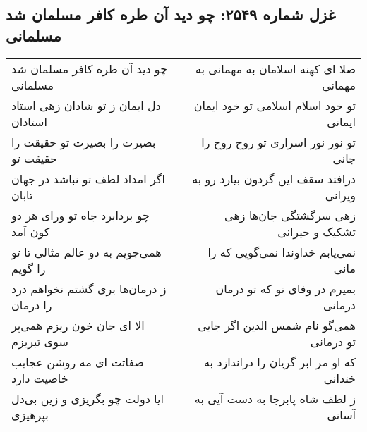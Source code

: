 \begin{center}
\section*{غزل شماره ۲۵۴۹: چو دید آن طره کافر مسلمان شد مسلمانی}
\label{sec:2549}
\begin{longtable}{l p{0.5cm} r}
چو دید آن طره کافر مسلمان شد مسلمانی
&&
صلا ای کهنه اسلامان به مهمانی به مهمانی
\\
دل ایمان ز تو شادان زهی استاد استادان
&&
تو خود اسلام اسلامی تو خود ایمان ایمانی
\\
بصیرت را بصیرت تو حقیقت را حقیقت تو
&&
تو نور نور اسراری تو روح روح را جانی
\\
اگر امداد لطف تو نباشد در جهان تابان
&&
درافتد سقف این گردون بیارد رو به ویرانی
\\
چو بردابرد جاه تو ورای هر دو کون آمد
&&
زهی سرگشتگی جان‌ها زهی تشکیک و حیرانی
\\
همی‌جویم به دو عالم مثالی تا تو را گویم
&&
نمی‌یابم خداوندا نمی‌گویی که را مانی
\\
ز درمان‌ها بری گشتم نخواهم درد را درمان
&&
بمیرم در وفای تو که تو درمان درمانی
\\
الا ای جان خون ریزم همی‌پر سوی تبریزم
&&
همی‌گو نام شمس الدین اگر جایی تو درمانی
\\
صفاتت ای مه روشن عجایب خاصیت دارد
&&
که او مر ابر گریان را دراندازد به خندانی
\\
ایا دولت چو بگریزی و زین بی‌دل بپرهیزی
&&
ز لطف شاه پابرجا به دست آیی به آسانی
\\
\end{longtable}
\end{center}
